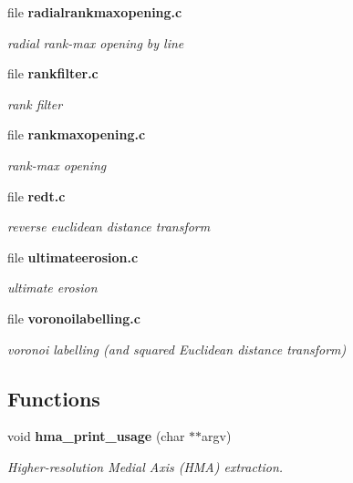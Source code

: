 \begin{CompactItemize}
\item 
file {\bf radialrankmaxopening.c}
\begin{CompactList}\small\item\em radial rank-max opening by line \item\end{CompactList}

\item 
file {\bf rankfilter.c}
\begin{CompactList}\small\item\em rank filter \item\end{CompactList}

\item 
file {\bf rankmaxopening.c}
\begin{CompactList}\small\item\em rank-max opening \item\end{CompactList}

\item 
file {\bf redt.c}
\begin{CompactList}\small\item\em reverse euclidean distance transform \item\end{CompactList}

\item 
file {\bf ultimateerosion.c}
\begin{CompactList}\small\item\em ultimate erosion \item\end{CompactList}

\item 
file {\bf voronoilabelling.c}
\begin{CompactList}\small\item\em voronoi labelling (and squared Euclidean distance transform) \item\end{CompactList}

\end{CompactItemize}
\subsection*{Functions}
\begin{CompactItemize}
\item 
void {\bf hma\_\-print\_\-usage} (char $\ast$$\ast$argv)
\begin{CompactList}\small\item\em Higher-resolution Medial Axis (HMA) extraction. \item\end{CompactList}\end{CompactItemize}


